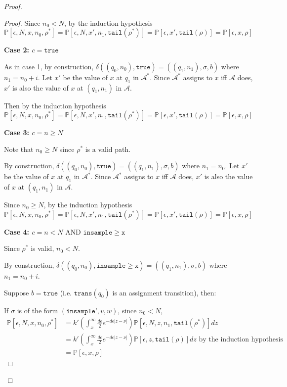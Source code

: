 \documentclass[12pt]{article}
\newcommand{\PP}{\mathbb{P}}
\newcommand{\gguard}{\texttt{insample}\geq \texttt{x}}
\newcommand{\gaguard}{n<N \text{ AND } \texttt{insample} \geq \texttt{x}}
\theoremstyle{definition}
\begin{document}
\begin{proof}
\begin{proof}
	Since $n_0 < N$, by the induction hypothesis
		\[
			\PP[\epsilon, N, x, n_0, \rho^*] = \PP[\epsilon, N, x', n_1, \texttt{tail}(\rho^*)] = \PP[\epsilon, x', \texttt{tail}(\rho)] = \PP[\epsilon, x, \rho]
		\]

	\textbf{Case 2: $c = \texttt{true}$}

	As in case 1, by construction, $\delta((q_0, n_0), \texttt{true}) = ((q_1, n_1), \sigma, b)$ where $n_1 = n_0 + i$. Let $x'$ be the value of $x$ at $q_1$ in $\mathcal{A}^*$. Since $\mathcal{A}^*$ assigns to $x$ iff $\mathcal{A}$ does, $x'$ is also the value of $x$ at $(q_1, n_1)$ in $\mathcal{A}$.

	Then by the induction hypothesis
		\[
			\PP[\epsilon, N, x, n_0, \rho^*] = \PP[\epsilon, N, x', n_1, \texttt{tail}(\rho^*)] = \PP[\epsilon, x', \texttt{tail}(\rho)] = \PP[\epsilon, x, \rho]
		\]

	\textbf{Case 3: $c = n\geq N$}

	Note that $ n_0 \geq N$ since $\rho^*$ is a valid path.
	
	By construction, $\delta((q_0, n_0), \texttt{true}) = ((q_1, n_1), \sigma, b)$ where $n_1 = n_0$. Let $x'$ be the value of $x$ at $q_1$ in $\mathcal{A}^*$. Since $\mathcal{A}^*$ assigns to $x$ iff $\mathcal{A}$ does, $x'$ is also the value of $x$ at $(q_1, n_1)$ in $\mathcal{A}$.

	Since $n_0 \geq N$, by the induction hypothesis
		\[
			\PP[\epsilon, N, x, n_0, \rho^*] = \PP[\epsilon, N, x', n_1, \texttt{tail}(\rho^*)] = \PP[\epsilon, x', \texttt{tail}(\rho)] = \PP[\epsilon, x, \rho]
		\]

	\textbf{Case 4: $c = \gaguard$}

	Since $\rho^*$ is valid, $n_0 < N$. 

	By construction, $\delta((q_0, n_0), \gguard) = ((q_1, n_1), \sigma, b)$ where $n_1 = n_0+i$. 

	Suppose $b = \texttt{true}$ (i.e. $\texttt{trans}(q_0)$ is an assignment transition), then:

	If $\sigma$ is of the form $(\texttt{insample'}, v, w)$, since $n_0 < N$, 
		\begin{align*}
			\PP[\epsilon, N, x, n_0, \rho^*] &= k'\left(\int_x^\infty\frac{d\epsilon}{2}e^{-d\epsilon|z-\nu|}\right)\PP[\epsilon, N, z, n_1, \texttt{tail}(\rho^*)]dz \\
			&= k'\left(\int_x^\infty\frac{d\epsilon}{2}e^{-d\epsilon|z-\nu|}\right)\PP[\epsilon, z, \texttt{tail}(\rho)]dz \text{ by the induction hypothesis }\\
			&= \PP[\epsilon, x, \rho]
		\end{align*}
	

\end{proof}
\end{proof}
\end{document}
